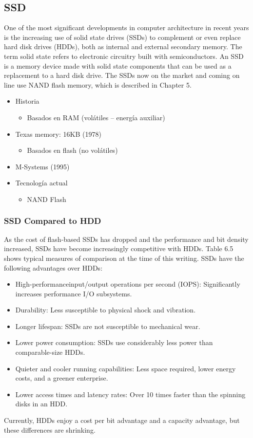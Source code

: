 \subsection{SSD}
One of the most significant developments in computer architecture in recent years is
the increasing use of solid state drives (SSDs) to complement or even replace hard
disk drives (HDDs), both as internal and external secondary memory. The term solid
state refers to electronic circuitry built with semiconductors. An SSD is a memory
device made with solid state components that can be used as a replacement to a
hard disk drive. The SSDs now on the market and coming on line use NAND flash
memory, which is described in Chapter 5.

\begin{itemize}
\item Historia
	\begin{itemize}
	\item Basados en RAM (volátiles – energía auxiliar)
	\end{itemize}
\item Texas memory: 16KB (1978)
	\begin{itemize}
	\item Basados en flash (no volátiles)
	\end{itemize}
\item M-Systems (1995)
\item Tecnología actual
	\begin{itemize}
	\item NAND Flash
	\end{itemize}
\end{itemize}

\subsubsection{SSD Compared to HDD}
As the cost of flash-based SSDs has dropped and the performance and bit density increased, SSDs have become increasingly competitive with HDDs. Table 6.5 shows typical measures of comparison at the time of this writing. SSDs have the following advantages over HDDs:
\begin{itemize}
\item High-performanceinput/output operations per second (IOPS): Significantly increases performance I/O subsystems.
\item Durability: Less susceptible to physical shock and vibration.
\item Longer lifespan: SSDs are not susceptible to mechanical wear.
\item Lower power consumption: SSDs use considerably less power than comparable-size HDDs.
\item Quieter and cooler running capabilities: Less space required, lower energy costs, and a greener enterprise.
\item Lower access times and latency rates: Over 10 times faster than the spinning disks in an HDD.
\end{itemize}
Currently, HDDs enjoy a cost per bit advantage and a capacity advantage, but
these differences are shrinking.

